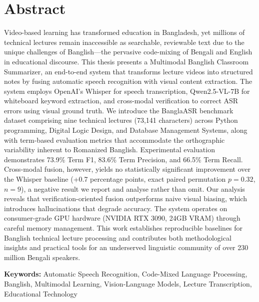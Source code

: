 \section*{Abstract}
Video-based learning has transformed education in Bangladesh, yet millions of technical lectures remain inaccessible as searchable, reviewable text due to the unique challenges of Banglish---the pervasive code-mixing of Bengali and English in educational discourse. This thesis presents a Multimodal Banglish Classroom Summarizer, an end-to-end system that transforms lecture videos into structured notes by fusing automatic speech recognition with visual content extraction. The system employs OpenAI's Whisper for speech transcription, Qwen2.5-VL-7B for whiteboard keyword extraction, and cross-modal verification to correct ASR errors using visual ground truth. We introduce the BanglaASR benchmark dataset comprising nine technical lectures (73,141 characters) across Python programming, Digital Logic Design, and Database Management Systems, along with term-based evaluation metrics that accommodate the orthographic variability inherent to Romanized Banglish. Experimental evaluation demonstrates 73.9\% Term F1, 83.6\% Term Precision, and 66.5\% Term Recall. Cross-modal fusion, however, yields no statistically significant improvement over the Whisper baseline (+0.7 percentage points, exact paired permutation $p = 0.32$, $n = 9$), a negative result we report and analyse rather than omit. Our analysis reveals that verification-oriented fusion outperforms naive visual biasing, which introduces hallucinations that degrade accuracy. The system operates on consumer-grade GPU hardware (NVIDIA RTX 3090, 24GB VRAM) through careful memory management. This work establishes reproducible baselines for Banglish technical lecture processing and contributes both methodological insights and practical tools for an underserved linguistic community of over 230 million Bengali speakers.

\vspace{1cm}
\textbf{Keywords:} Automatic Speech Recognition, Code-Mixed Language Processing, Banglish, Multimodal Learning, Vision-Language Models, Lecture Transcription, Educational Technology
\pagebreak
